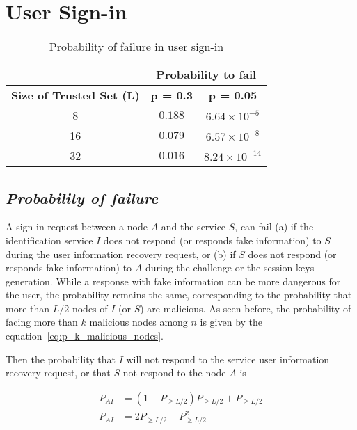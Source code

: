 \section{User Sign-in}
\label{sec:eval_sign_in}
  \begin{table}
    \centering
    \footnotesize
    \begin{tabular}{|c|c|c|}
      \cline{2-3}
      \multicolumn{1}{c|}{}&  \multicolumn{2}{c|}{\textbf{Probability to fail}} \\ \cline{2-3}
      \hline
      \textbf{Size of Trusted Set (L)} & \textbf{p = 0.3} & \textbf{p = 0.05} \\
      \hline \hline
      8 &  $0.188$ & $6.64 \times 10^{-5}$ \\
      \hline
      16 & $0.079$ & $6.57 \times 10^{-8}$  \\
      \hline
      32 & $0.016$ & $8.24 \times 10^{-14}$  \\
      \hline
    \end{tabular}
    \caption{Probability of failure in user sign-in}
    \label{tab:p_sign_in}
  \end{table}
  
  \subsection{\textit{Probability of failure}}
    A sign-in request between a node $A$ and the service $S$, can fail (a) if the identification service $I$ does
not respond (or responds fake information) to $S$ during the user information recovery
request, or (b) if $S$ does not respond (or responds fake information) to $A$
during the challenge or the session keys generation. While a response with fake information can be more dangerous for the
user, the probability remains the same, corresponding to the
probability that more than $L/2$ nodes of $I$ (or $S$) are malicious.
    As seen before, the probability of facing more than $k$ malicious nodes among
$n$ is given by the equation~\ref{eq:p_k_malicious_nodes}.

    Then the probability that $I$ will not respond to the service user
information recovery request, or that $S$ not respond to the node $A$ is

    \begin{align}
      P_{AI} &= (1- P_{\ge L/2}) P_{\ge L/2} +  P_{\ge L/2} \\
      P_{AI} &= 2P_{\ge L/2} - P^2_{\ge L/2}
    \end{align}


